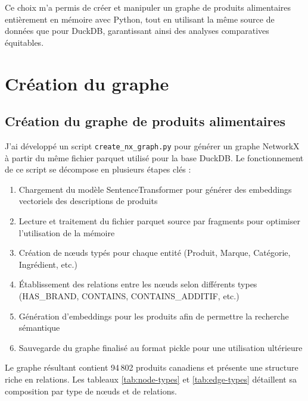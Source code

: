 \documentclass[a4paper,11pt]{article}
\begin{document}
Ce choix m'a permis de créer et manipuler un graphe de produits alimentaires entièrement en mémoire avec Python, tout en utilisant la même source de données que pour DuckDB, garantissant ainsi des analyses comparatives équitables.



\section{Création du graphe}
\label{sec:creation-graphe}


\subsection{Création du graphe de produits alimentaires}

J'ai développé un script \texttt{create\_nx\_graph.py} pour générer un graphe NetworkX à partir du même fichier parquet utilisé pour la base DuckDB. Le fonctionnement de ce script se décompose en plusieurs étapes clés :

\begin{enumerate}
    \item Chargement du modèle SentenceTransformer pour générer des embeddings vectoriels des descriptions de produits
    \item Lecture et traitement du fichier parquet source par fragments pour optimiser l'utilisation de la mémoire
    \item Création de nœuds typés pour chaque entité (Produit, Marque, Catégorie, Ingrédient, etc.)
    \item Établissement des relations entre les nœuds selon différents types (HAS\_BRAND, CONTAINS, CONTAINS\_ADDITIF, etc.)
    \item Génération d'embeddings pour les produits afin de permettre la recherche sémantique
    \item Sauvegarde du graphe finalisé au format pickle pour une utilisation ultérieure
\end{enumerate}


Le graphe résultant contient 94\,802 produits canadiens et présente une structure riche en relations. Les tableaux \ref{tab:node-types} et \ref{tab:edge-types} détaillent sa composition par type de nœuds et de relations.
\end{document}
